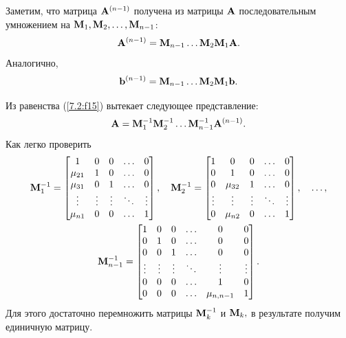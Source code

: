 \documentclass[12pt]{article}
\begin{document}
    Заметим, что матрица $\bold{A}^{\left(n-1\right)}$ получена из матрицы $\bold{A}$ последовательным умножением на $\bold{M}_1, \bold{M}_2, \ldots, \bold{M}_{n-1}$:
    \begin{equation}
        \bold{A}^{\left(n-1\right)}=\bold{M}_{n-1}\ldots\bold{M}_2\bold{M}_1\bold{A}.
        \label{7.2:f15}
    \end{equation}
    Аналогично,
    \begin{equation}
        \bold{b}^{\left(n-1\right)}=\bold{M}_{n-1}\ldots\bold{M}_2\bold{M}_1\bold{b}.
    \end{equation}

    Из равенства (\ref{7.2:f15}) вытекает следующее представление:
    \begin{equation}
        \bold{A} = \bold{M}_1^{-1}\bold{M}_2^{-1}\ldots\bold{M}_{n-1}^{-1}\bold{A}^{\left(n-1\right)}.
        \label{7.2:f17}
    \end{equation}
    Как легко проверить
    \begin{equation}
        \begin{gathered}
            \bold{M}_1^{-1}=\begin{bmatrix}
                1 & 0 & 0 & \ldots & 0 \\
                \mu_{21} & 1 & 0 & \ldots & 0 \\
                \mu_{31} & 0 & 1 & \ldots & 0 \\
                \vdots & \vdots & \vdots & \ddots & \vdots \\
                \mu_{n1} & 0 & 0 & \ldots & 1
            \end{bmatrix},\quad
            \bold{M}_2^{-1}=
            \begin{bmatrix}
                1 & 0 & 0 & \ldots & 0 \\
                0 & 1 & 0 & \ldots & 0 \\
                0 & \mu_{32} & 1 & \ldots & 0 \\
                 \vdots & \vdots & \vdots & \ddots & \vdots \\
                 0 & \mu_{n2} & 0 & \ldots & 1
            \end{bmatrix},\quad\ldots,\\
            \bold{M}_{n-1}^{-1}=
            \begin{bmatrix}
                1 & 0 & 0 & \ldots & 0 & 0 \\
                0 & 1 & 0 & \ldots & 0 & 0 \\
                0 & 0 & 1 & \ldots & 0 & 0 \\
                 \vdots & \vdots & \vdots & \ddots & \vdots &  \vdots \\
                 0 & 0 & 0 & \ldots & 1 & 0 \\
                 0 & 0 & 0 & \ldots & \mu_{n,n-1} & 1
            \end{bmatrix}.
        \end{gathered}
    \end{equation}
    Для этого достаточно перемножить матрицы $\bold{M}^{-1}_k$ и $\bold{M}_k,$ в результате получим единичную матрицу.
\end{document}
